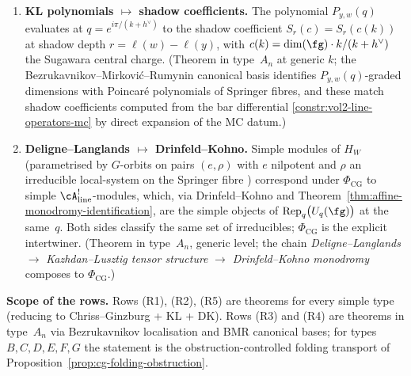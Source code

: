 \begin{proposition}
\begin{enumerate}
 $C_w \in H_W$, expanded in the standard basis as
 $C_w = \sum_{y\le w} P_{y,w}(q)\, T_y$, maps under
 $\Phi_{\mathrm{CG}}$ to the equivariant
 cohomology class of the fixed-point stratum
 $\mathfrak{S}_w \subset \mathfrak{S}$, and from there, under
 $\Psi_{\mathrm{KL}}$, to the degree-$|w|$ MC shadow generator
 $\alpha_T^{(w)}$ in
 $\mathrm{MC}\bigl(\mathrm{hom}_\alpha(\barB^{\mathrm{ord}}(\cA),
 \operatorname{End}(M))\bigr)$.
 (Theorem in type~$A_n$; proof by Bezrukavnikov's
 localisation \cite{Bezrukavnikov16} intertwining
 $K^{G\times\C^\times}(\widetilde{\cN})$ with category~$\cO$
 at level~$k$, then transport along~$\Psi_{\mathrm{KL}}$.
 For non-type-$A$ root systems this row is asserted only after
 the folding obstruction of
 Proposition~\ref{prop:cg-folding-obstruction} vanishes.)
\item[\textup{(R4)}]
 \textbf{KL polynomials $\mapsto$ shadow coefficients.}
 The polynomial $P_{y,w}(q)$ evaluates at $q=e^{i\pi/(k+h^\vee)}$
 to the shadow coefficient
 $S_r(c) = S_r(c(k))$ at shadow depth $r = \ell(w)-\ell(y)$,
 with $c(k) = \dim(\fg)\cdot k/(k+h^\vee)$ the Sugawara central
 charge. (Theorem in type~$A_n$ at generic $k$; the
 Bezrukavnikov--Mirkovi\'c--Rumynin canonical basis
 \cite{BMR08} identifies $P_{y,w}(q)$-graded dimensions with
 Poincar\'e polynomials of Springer fibres, and these match
 shadow coefficients computed from the bar differential
 \eqref{constr:vol2-line-operators-mc} by direct expansion
 of the MC datum.)
\item[\textup{(R5)}]
 \textbf{Deligne--Langlands $\mapsto$ Drinfeld--Kohno.}
 Simple modules of $H_W$ (parametrised by
 $G$-orbits on pairs $(e,\rho)$ with $e$ nilpotent and
 $\rho$ an irreducible local-system on the Springer fibre
 \cite{KL87}) correspond under $\Phi_{\mathrm{CG}}$ to
 simple $\cA^!_{\mathrm{line}}$-modules, which, via Drinfeld--Kohno
 and Theorem~\ref{thm:affine-monodromy-identification},
 are the simple objects of
 $\operatorname{Rep}_q\bigl(U_q(\fg)\bigr)$ at the same~$q$.
 Both sides classify the same set of irreducibles;
 $\Phi_{\mathrm{CG}}$ is the explicit intertwiner.
 (Theorem in type~$A_n$, generic level; the chain
 \emph{Deligne--Langlands} \cite{KL87}
 $\rightarrow$ \emph{Kazhdan--Lusztig tensor structure}
 $\rightarrow$ \emph{Drinfeld--Kohno monodromy}
 composes to $\Phi_{\mathrm{CG}}$.)
\end{enumerate}
\textbf{Scope of the rows.} Rows \textup{(R1), (R2), (R5)}
are theorems for every simple type (reducing to
Chriss--Ginzburg + KL + DK). Rows \textup{(R3)} and
\textup{(R4)} are theorems in type~$A_n$ via Bezrukavnikov
localisation and BMR canonical bases; for types
$B, C, D, E, F, G$ the statement is the obstruction-controlled
folding transport of Proposition~\ref{prop:cg-folding-obstruction}.
\end{proposition}

